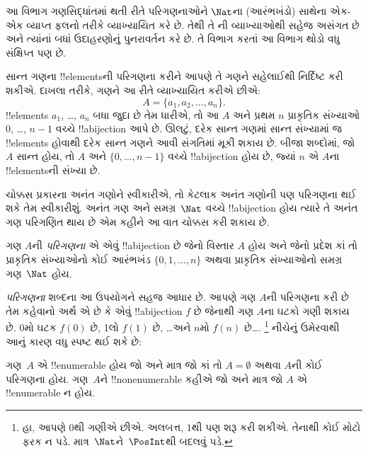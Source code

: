 \documentclass[../../../include/open-logic-section]{subfiles}
\begin{document}


\begin{editorial}
  આ વિભાગ ગણસિદ્ધાંતમાં થતી રીતે પરિગણનાઓને $\Nat$ના
  (આરંભખંડો) સાથેના એક-એક વ્યાપ્ત ફલનો તરીકે વ્યાખ્યાયિત કરે છે.
  તેથી તે ની વ્યાખ્યાઓથી સહેજ અસંગત છે અને ત્યાંનાં
  બધાં ઉદાહરણોનું પુનરાવર્તન કરે છે. તે વિભાગ કરતાં આ વિભાગ થોડો
  વધુ સંક્ષિપ્ત પણ છે.
\end{editorial}

સાન્ત ગણના !!{element}sની પરિગણના કરીને આપણે તે ગણને સહેલાઈથી
નિર્દિષ્ટ કરી શકીએ. દાખલા તરીકે, ગણને આ રીતે વ્યાખ્યાયિત કરીએ છીએ:
\[
  A = \{a_1, a_2, \ldots, a_n\}.
\]
!!{element}s $a_1$, \dots, $a_n$ બધા જુદા છે તેમ ધારીએ, તો આ
$A$ અને પ્રથમ $n$ પ્રાકૃતિક સંખ્યાઓ $0$, \dots, $n-1$ વચ્ચે
!!a{bijection} આપે છે. ઊલટું, દરેક સાન્ત ગણમાં સાન્ત સંખ્યામાં જ
!!{element}s હોવાથી દરેક સાન્ત ગણને આવી સંગતિમાં મૂકી શકાય છે.
બીજા શબ્દોમાં, જો $A$ સાન્ત હોય, તો $A$ અને $\{0, \dots, n-1\}$
વચ્ચે !!a{bijection} હોય છે, જ્યાં $n$ એ $A$ના !!{element}sની સંખ્યા છે.

ચોક્કસ પ્રકારના અનંત ગણોને સ્વીકારીએ, તો કેટલાક અનંત ગણોની પણ
પરિગણના થઈ શકે તેમ સ્વીકારીશું. અનંત ગણ અને સમગ્ર~$\Nat$ વચ્ચે
!!a{bijection} હોય ત્યારે તે અનંત ગણ પરિગણિત થાય છે એમ કહીને આ
વાત ચોક્કસ કરી શકાય છે.

\begin{defn}
ગણ $A$ની \emph{પરિગણના} એ એવું !!a{bijection} છે જેનો વિસ્તાર
$A$ હોય અને જેનો પ્રદેશ કાં તો પ્રાકૃતિક સંખ્યાઓનો કોઈ આરંભખંડ
$\{0, 1, \ldots, n\}$ {અથવા} પ્રાકૃતિક સંખ્યાઓનો સમગ્ર ગણ~$\Nat$ હોય.
\end{defn}

\begin{explain}
\emph{પરિગણના} શબ્દના આ ઉપયોગને સહજ આધાર છે. આપણે ગણ $A$ની
પરિગણના કરી છે તેમ કહેવાનો અર્થ એ છે કે એવું !!a{bijection} $f$
છે જેનાથી ગણ $A$ના ઘટકો ગણી શકાય છે. $0$મો ઘટક $f(0)$ છે,
1લો $f(1)$ છે, \ldots અને $n$મો $f(n)$ છે\ldots.
\footnote{હા, આપણે $0$થી ગણીએ છીએ. અલબત્ત, $1$થી પણ શરૂ કરી
શકીએ. તેનાથી કોઈ મોટો ફરક ન પડે. માત્ર~$\Nat$ને~$\PosInt$થી
બદલવું પડે.} નીચેનું ઉમેરવાથી આનું કારણ વધુ સ્પષ્ટ થઈ શકે છે:
\end{explain}

\begin{defn}
  ગણ~$A$ એ !!{enumerable} હોય જો અને માત્ર જો કાં તો
  $A = \emptyset$ અથવા $A$ની કોઈ પરિગણના હોય. ગણ~$A$ને
  !!{nonenumerable} કહીએ જો અને માત્ર જો $A$ એ !!{enumerable} ન હોય.
\end{defn}
\end{document}
